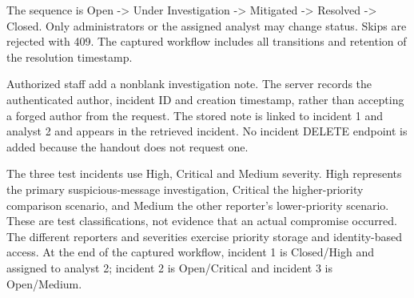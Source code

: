 The sequence is Open -> Under Investigation -> Mitigated -> Resolved -> Closed. Only administrators or the assigned analyst may change status. Skips are rejected with 409. The captured workflow includes all transitions and retention of the resolution timestamp.

Authorized staff add a nonblank investigation note. The server records the authenticated author, incident ID and creation timestamp, rather than accepting a forged author from the request. The stored note is linked to incident 1 and analyst 2 and appears in the retrieved incident. No incident DELETE endpoint is added because the handout does not request one.

The three test incidents use High, Critical and Medium severity. High represents the primary suspicious-message investigation, Critical the higher-priority comparison scenario, and Medium the other reporter's lower-priority scenario. These are test classifications, not evidence that an actual compromise occurred. The different reporters and severities exercise priority storage and identity-based access. At the end of the captured workflow, incident 1 is Closed/High and assigned to analyst 2; incident 2 is Open/Critical and incident 3 is Open/Medium.
